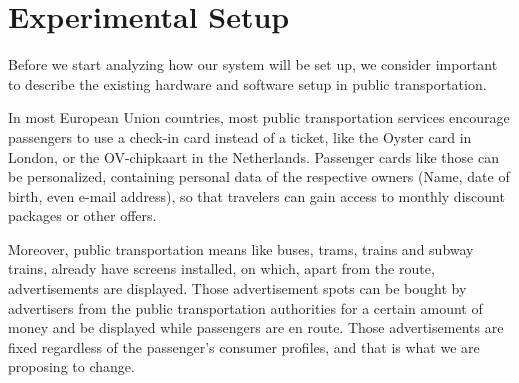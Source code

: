 \documentclass[letterpaper,11pt]{article}
\begin{document}
\newpage

\section{Experimental Setup}

Before we start analyzing how our system will be set up, we consider important to describe the existing hardware and software setup in public transportation.

In most European Union countries, most public transportation services encourage passengers to use a check-in card instead of a ticket, like the Oyster card in London, or the OV-chipkaart in the Netherlands. Passenger cards like those can be personalized, containing personal data of the respective owners (Name, date of birth, even e-mail address), so that travelers can gain access to monthly discount packages or other offers.

Moreover, public transportation means like buses, trams, trains and subway trains, already have screens installed, on which, apart from the route, advertisements are displayed. Those advertisement spots can be bought by advertisers from the public transportation authorities for a certain amount of money and be displayed while passengers are en route. Those advertisements are fixed regardless of the passenger's consumer profiles, and that is what we are proposing to change.
\end{document}
